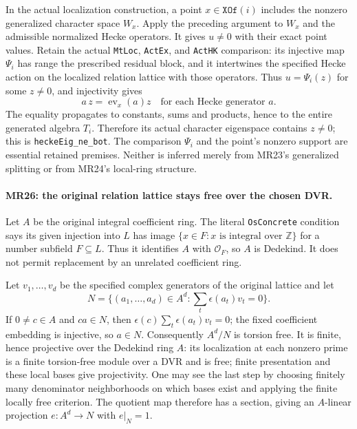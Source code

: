 In the actual localization construction, a point
$x\in\texttt{XOf}(i)$ includes the nonzero generalized
character space $W_x$. Apply the preceding argument to
$W_x$ and the admissible normalized Hecke operators. It gives
$u\ne0$ with their exact point values. Retain the actual
\texttt{MtLoc}, \texttt{ActEx}, and \texttt{ActHK} comparison:
its injective map $\Psi_i$ has range the prescribed residual
block, and it intertwines the specified Hecke action on the
localized relation lattice with those operators. Thus
$u=\Psi_i(z)$ for some $z\ne0$, and injectivity gives
\[
       a\,z=\operatorname{ev}_x(a)z
              \quad\text{for each Hecke generator }a. \tag{MR.38}
\]
The equality propagates to constants, sums and products, hence
to the entire generated algebra $T_i$. Therefore its actual
character eigenspace contains $z\ne0$; this is
\texttt{heckeEig\_ne\_bot}. The comparison $\Psi_i$ and
the point's nonzero support are essential retained premises.
Neither is inferred merely from MR23's generalized splitting
or from MR24's local-ring structure.

\paragraph{MR26: the original relation lattice stays free over the chosen DVR.}
Let $A$ be the original integral coefficient ring. The literal
\texttt{OsConcrete} condition says its given injection into
$L$ has image
$\{x\in F:x\text{ is integral over }\mathbb Z\}$ for a
number subfield $F\subseteq L$. Thus it identifies $A$ with
$\mathcal O_F$, so $A$ is Dedekind. It does not permit
replacement by an unrelated coefficient ring.

Let $v_1,\ldots,v_d$ be the specified complex generators of
the original lattice and let
\[
 N=\{(a_1,\ldots,a_d)\in A^d:
                 \sum_t\epsilon(a_t)v_t=0\}.          \tag{MR.39}
\]
If $0\ne c\in A$ and $ca\in N$, then
$\epsilon(c)\sum_t\epsilon(a_t)v_t=0$; the fixed coefficient
embedding is injective, so $a\in N$. Consequently $A^d/N$
is torsion free. It is finite, hence projective over the Dedekind
ring $A$: its localization at each nonzero prime is a finite
torsion-free module over a DVR and is free; finite presentation
and these local bases give projectivity. One may see the last
step by choosing finitely many denominator neighborhoods on
which bases exist and applying the finite locally free
criterion. The quotient map therefore has a section, giving
an $A$-linear projection $e:A^d\to N$ with $e|_N=1$.

